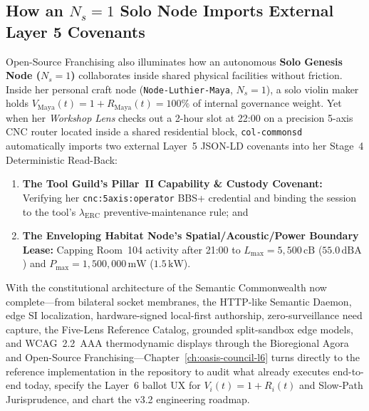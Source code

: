 \subsection{How an $N_s = 1$ Solo Node Imports External Layer 5 Covenants}

Open-Source Franchising also illuminates how an autonomous \textbf{Solo Genesis Node ($N_s = 1$)} collaborates inside shared physical facilities without friction. Inside her personal craft node (\texttt{Node-Luthier-Maya}, $N_s = 1$), a solo violin maker holds $V_{\mathrm{Maya}}(t) = 1 + R_{\mathrm{Maya}}(t) = 100\%$ of internal governance weight. Yet when her \textit{Workshop Lens} checks out a 2-hour slot at 22:00 on a precision 5-axis CNC router located inside a shared residential block, \texttt{col-commonsd} automatically imports two external Layer~5 JSON-LD covenants into her Stage~4 Deterministic Read-Back:
\begin{enumerate}
    \item \textbf{The Tool Guild's Pillar~II Capability \& Custody Covenant:} Verifying her \texttt{cnc:5axis:operator} BBS+ credential and binding the session to the tool's $\lambda_{\mathrm{ERC}}$ preventive-maintenance rule; and
    \item \textbf{The Enveloping Habitat Node's Spatial/Acoustic/Power Boundary Lease:} Capping Room~104 activity after 21:00 to $L_{\max} = 5{,}500\,\mathrm{cB}$ ($55.0\,\mathrm{dBA}$) and $P_{\max} = 1{,}500{,}000\,\mathrm{mW}$ ($1.5\,\mathrm{kW}$).
\end{enumerate}

With the constitutional architecture of the Semantic Commonwealth now complete---from bilateral socket membranes, the HTTP-like Semantic Daemon, edge SI localization, hardware-signed local-first authorship, zero-surveillance need capture, the Five-Lens Reference Catalog, grounded split-sandbox edge models, and WCAG~2.2~AAA thermodynamic displays through the Bioregional Agora and Open-Source Franchising---Chapter~\ref{ch:oasis-council-l6} turns directly to the reference implementation in the repository to audit what already executes end-to-end today, specify the Layer~6 ballot UX for $V_i(t) = 1 + R_i(t)$ and Slow-Path Jurisprudence, and chart the v3.2 engineering roadmap.
